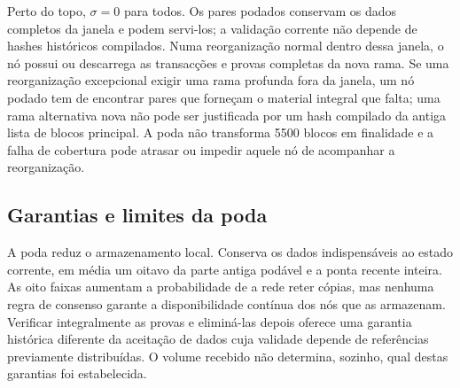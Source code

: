 Perto do topo, \(\sigma=0\) para todos. Os pares podados conservam os dados
completos da janela e podem servi-los; a validação corrente não depende de
hashes históricos compilados. Numa reorganização normal dentro dessa janela,
o nó possui ou descarrega as transacções e provas completas da nova rama. Se
uma reorganização excepcional exigir uma rama profunda fora da janela, um nó
podado tem de encontrar pares que forneçam o material integral que falta; uma
rama alternativa nova não pode ser justificada por um hash compilado da antiga
lista de blocos principal. A poda não transforma 5500 blocos em finalidade e a falha de
cobertura pode atrasar ou impedir aquele nó de acompanhar a reorganização.

\subsection{Garantias e limites da poda}

A poda reduz o armazenamento local. Conserva os dados indispensáveis ao estado
corrente, em média um oitavo da parte antiga podável e a ponta recente inteira.
As oito faixas aumentam a probabilidade de a rede reter cópias, mas nenhuma
regra de consenso garante a disponibilidade contínua dos nós que as armazenam.
Verificar integralmente as provas e eliminá-las depois oferece uma garantia
histórica diferente da aceitação de dados cuja validade depende de
referências previamente distribuídas. O volume recebido não determina,
sozinho, qual destas garantias foi estabelecida.
